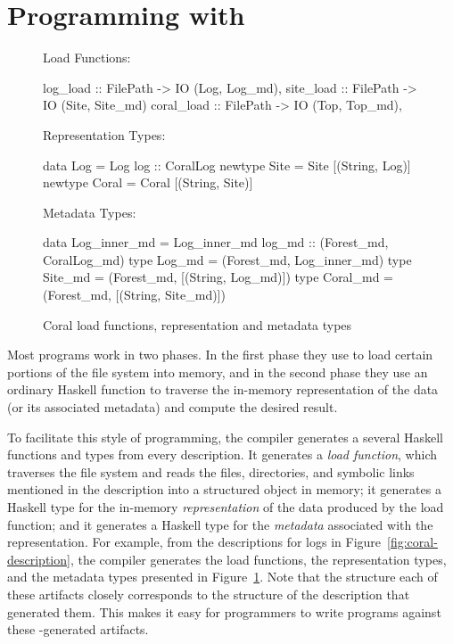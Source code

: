 \section{Programming with \forest{}}
\label{sec:exp}

\begin{figure}
Load Functions:
\begin{code}
log_load :: FilePath -> IO (Log, Log_md),
site_load :: FilePath -> IO (Site, Site_md)
coral_load :: FilePath -> IO (Top, Top_md),
\end{code}
%
Representation Types:
\begin{code}
data Log = Log { log :: CoralLog }
newtype Site = Site [(String, Log)]
newtype Coral = Coral [(String, Site)]
\end{code}
%
Metadata Types:
\begin{code}
data Log_inner_md = 
  Log_inner_md { log_md :: (Forest_md, CoralLog_md) }
type Log_md = (Forest_md, Log_inner_md)
type Site_md = (Forest_md, [(String, Log_md)])
type Coral_md = (Forest_md, [(String, Site_md)])
\end{code}
\caption{Coral load functions, representation and metadata types}
\label{fig:coral-aux}
\end{figure}

Most \forest{} programs work in two phases. In the first phase they
use \forest{} to load certain portions of the file system into memory,
and in the second phase they use an ordinary Haskell function to
traverse the in-memory representation of the data (or its associated
metadata) and compute the desired result.


To facilitate this style of programming, the \forest{} compiler
generates a several Haskell functions and types from every \forest{}
description.  It generates a \emph{load function}, which traverses the
file system and reads the files, directories, and symbolic links
mentioned in the description into a structured object in memory; it
generates a Haskell type for the in-memory \emph{representation} of
the data produced by the load function; and it generates a Haskell
type for the \emph{metadata} associated with the representation. For
example, from the descriptions for \coral{} logs in
Figure~\ref{fig:coral-description}, the compiler generates the load
functions, the representation types, and the metadata types presented in
Figure~\ref{fig:coral-aux}. Note that the structure each of these
artifacts closely corresponds to the structure of the \forest{}
description that generated them. This makes it easy for programmers to
write programs against these \forest{}-generated artifacts.

